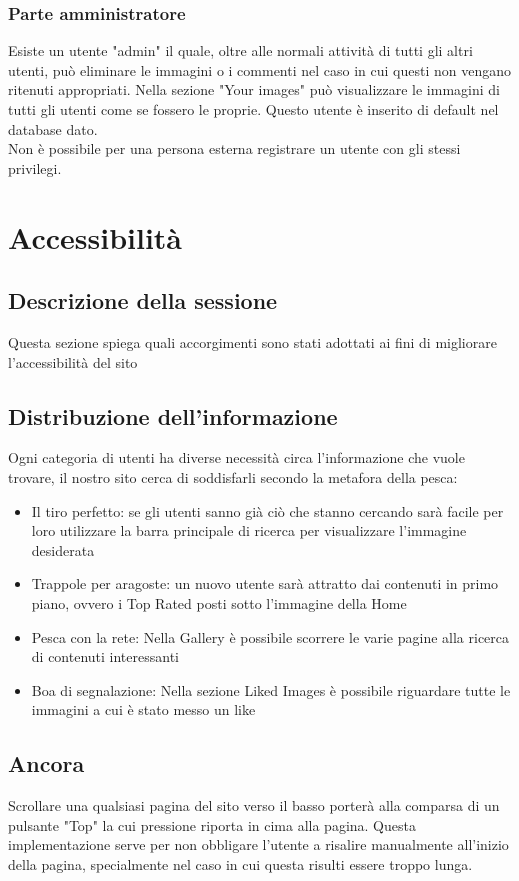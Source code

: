 \documentclass[openany, a4paper, 12pt]{report}
\begin{document}
	\subsection{Parte amministratore}
		Esiste un utente "admin" il quale, oltre alle normali attività di tutti gli altri utenti, può eliminare le immagini o i commenti nel caso in cui questi non vengano ritenuti appropriati. Nella sezione "Your images" può visualizzare le immagini di tutti gli utenti come se fossero le proprie.
		Questo utente è inserito di default nel database dato.\\
		Non è possibile per una persona esterna registrare un utente con gli stessi privilegi.

	\chapter{Accessibilità}
		\section{Descrizione della sessione}
		Questa sezione spiega quali accorgimenti sono stati adottati ai fini di migliorare l'accessibilità del sito
		\section{Distribuzione dell'informazione}
		Ogni categoria di utenti ha diverse necessità circa l'informazione che vuole trovare, il nostro sito cerca di soddisfarli secondo la metafora della pesca: 
		\begin{itemize}
					\item Il tiro perfetto: se gli utenti sanno già ciò che stanno cercando sarà facile per loro utilizzare la barra principale di ricerca per visualizzare l'immagine desiderata
					\item Trappole per aragoste: un nuovo utente sarà attratto dai contenuti in primo piano, ovvero i Top Rated posti sotto l'immagine della Home 
					\item Pesca con la rete: Nella Gallery è possibile scorrere le varie pagine alla ricerca di contenuti interessanti
					\item Boa di segnalazione: Nella sezione Liked Images è possibile riguardare tutte le immagini a cui è stato messo un like
		\end{itemize}
		\section{Ancora}
		Scrollare una qualsiasi pagina del sito verso il basso porterà alla comparsa di un pulsante "Top" la cui pressione riporta in cima alla pagina. Questa implementazione serve per non obbligare l'utente a risalire manualmente all'inizio della pagina, specialmente nel caso in cui questa risulti essere troppo lunga.
\end{document}
